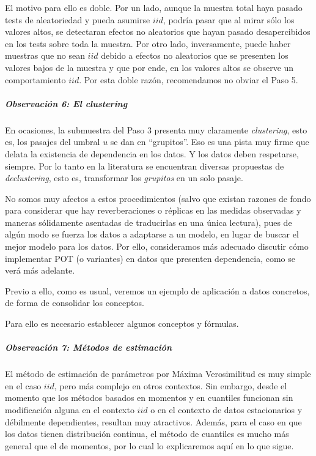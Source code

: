 \documentclass[
  12pt]{article}
\begin{document}
El motivo para ello es doble. Por un lado, aunque la muestra total haya
pasado tests de aleatoriedad y pueda asumirse \(iid\), podría pasar que
al mirar sólo los valores altos, se detectaran efectos no aleatorios que
hayan pasado desapercibidos en los tests sobre toda la muestra. Por otro
lado, inversamente, puede haber muestras que no sean \(iid\) debido a
efectos no aleatorios que se presenten los valores bajos de la muestra y
que por ende, en los valores altos se observe un comportamiento \(iid\).
Por esta doble razón, recomendamos no obviar el Paso 5.

\subparagraph{\texorpdfstring{Observación 6: El
\emph{clustering}}{Observación 6: El clustering}}\label{observaciuxf3n-6-el-clustering}

En ocasiones, la submuestra del Paso 3 presenta muy claramente
\emph{clustering}, esto es, los pasajes del umbral \(u\) se dan en
``grupitos''. Eso es una pista muy firme que delata la existencia de
dependencia en los datos. Y los datos deben respetarse, siempre. Por lo
tanto en la literatura se encuentran diversas propuestas de
\emph{declustering}, esto es, transformar los \emph{grupitos} en un solo
pasaje.

No somos muy afectos a estos procedimientos (salvo que existan razones
de fondo para considerar que hay reverberaciones o réplicas en las
medidas observadas y maneras sólidamente asentadas de traducirlas en una
única lectura), pues de algún modo se fuerza los datos a adaptarse a un
modelo, en lugar de buscar el mejor modelo para los datos. Por ello,
consideramos más adecuado discutir cómo implementar POT (o variantes) en
datos que presenten dependencia, como se verá más adelante.

Previo a ello, como es usual, veremos un ejemplo de aplicación a datos
concretos, de forma de consolidar los conceptos.

Para ello es necesario establecer algunos conceptos y fórmulas.

\subparagraph{Observación 7: Métodos de
estimación}\label{observaciuxf3n-7-muxe9todos-de-estimaciuxf3n}

El método de estimación de parámetros por Máxima Verosimilitud es muy
simple en el caso \(iid\), pero más complejo en otros contextos. Sin
embargo, desde el momento que los métodos basados en momentos y en
cuantiles funcionan sin modificación alguna en el contexto \(iid\) o en
el contexto de datos estacionarios y débilmente dependientes, resultan
muy atractivos. Además, para el caso en que los datos tienen
distribución continua, el método de cuantiles es mucho más general que
el de momentos, por lo cual lo explicaremos aquí en lo que sigue.
\end{document}
